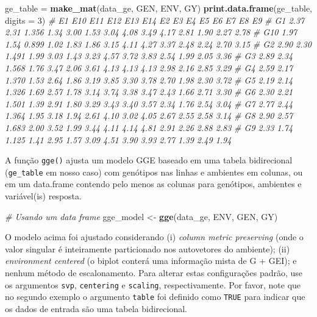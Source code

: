 \documentclass[
]{book}
\newenvironment{Shaded}{\begin{snugshade}}{\end{snugshade}}
\newcommand{\CommentTok}[1]{\textcolor[rgb]{0.56,0.35,0.01}{\textit{#1}}}
\newcommand{\DataTypeTok}[1]{\textcolor[rgb]{0.13,0.29,0.53}{#1}}
\newcommand{\DecValTok}[1]{\textcolor[rgb]{0.00,0.00,0.81}{#1}}
\newcommand{\KeywordTok}[1]{\textcolor[rgb]{0.13,0.29,0.53}{\textbf{#1}}}
\newcommand{\NormalTok}[1]{#1}
\newcommand{\StringTok}[1]{\textcolor[rgb]{0.31,0.60,0.02}{#1}}
\begin{document}
\begin{Shaded}
\begin{Highlighting}[]
\NormalTok{ge_table =}\StringTok{ }\KeywordTok{make_mat}\NormalTok{(data_ge, GEN, ENV, GY)}
\KeywordTok{print.data.frame}\NormalTok{(ge_table, }\DataTypeTok{digits =} \DecValTok{3}\NormalTok{)}
\CommentTok{#       E1  E10   E11  E12  E13  E14   E2   E3   E4   E5   E6   E7   E8   E9}
\CommentTok{# G1  2.37 2.31 1.356 1.34 3.00 1.53 3.04 4.08 3.49 4.17 2.81 1.90 2.27 2.78}
\CommentTok{# G10 1.97 1.54 0.899 1.02 1.83 1.86 3.15 4.11 4.27 3.37 2.48 2.24 2.70 3.15}
\CommentTok{# G2  2.90 2.30 1.491 1.99 3.03 1.43 3.23 4.57 3.72 3.83 2.54 1.99 2.05 3.36}
\CommentTok{# G3  2.89 2.34 1.568 1.76 3.47 2.06 3.61 4.13 4.13 4.13 2.98 2.16 2.85 3.29}
\CommentTok{# G4  2.59 2.17 1.370 1.53 2.64 1.86 3.19 3.85 3.30 3.78 2.70 1.98 2.30 3.72}
\CommentTok{# G5  2.19 2.14 1.326 1.69 2.57 1.78 3.14 3.74 3.38 3.47 2.43 1.66 2.71 3.30}
\CommentTok{# G6  2.30 2.21 1.501 1.39 2.91 1.80 3.29 3.43 3.40 3.57 2.34 1.76 2.54 3.04}
\CommentTok{# G7  2.77 2.44 1.364 1.95 3.18 1.94 2.61 4.10 3.02 4.05 2.67 2.55 2.58 3.14}
\CommentTok{# G8  2.90 2.57 1.683 2.00 3.52 1.99 3.44 4.11 4.14 4.81 2.91 2.26 2.88 2.83}
\CommentTok{# G9  2.33 1.74 1.125 1.41 2.95 1.57 3.09 4.51 3.90 3.93 2.77 1.39 2.49 1.94}
\end{Highlighting}
\end{Shaded}

A função \texttt{gge()} ajusta um modelo GGE baseado em uma tabela bidirecional (\texttt{ge\_table} em nosso caso) com genótipos nas linhas e ambientes em colunas, ou em um data.frame contendo pelo menos as colunas para genótipos, ambientes e variável(is) resposta.

\begin{Shaded}
\begin{Highlighting}[]
\CommentTok{# Usando um data frame}
\NormalTok{gge_model <-}\StringTok{ }\KeywordTok{gge}\NormalTok{(data_ge, ENV, GEN, GY)}
\end{Highlighting}
\end{Shaded}

O modelo acima foi ajustado considerando (i) \emph{column metric preserving} (onde o valor singular é inteiramente particionado nos autovetores do ambiente); (ii) \emph{environment centered} (o biplot conterá uma informação mista de G + GEI); e nenhum método de escalonamento. Para alterar estas configurações padrão, use os argumentos \texttt{svp}, \texttt{centering} e \texttt{scaling}, respectivamente. Por favor, note que no segundo exemplo o argumento \texttt{table} foi definido como \texttt{TRUE} para indicar que os dados de entrada são uma tabela bidirecional.
\end{document}
